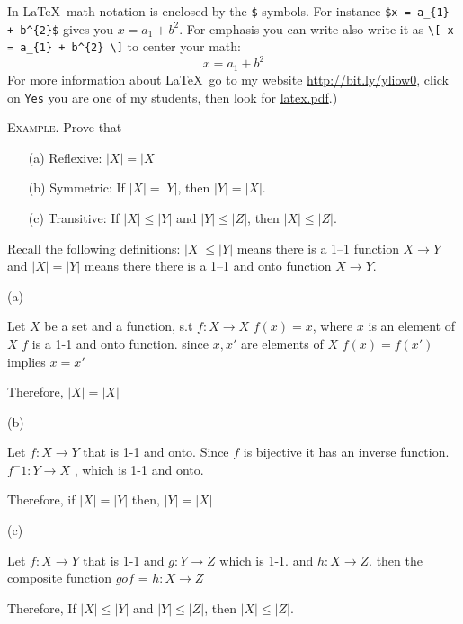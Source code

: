 

\renewcommand\AUTHOR{nweadick1@cougars.ccis.edu} %


\topmattertwo

In \LaTeX\, math notation is enclosed by the \verb!$! symbols.
For instance \verb!$x = a_{1} + b^{2}$! gives you $x = a_{1} + b^{2}$.
For emphasis you can write also write it as
\verb!\[ x = a_{1} + b^{2} \]!
to center your math:
\[
x = a_{1} + b^{2}
\]
For more information about \LaTeX\, go to my
website
\href{http://bit.ly/yliow0}{http://bit.ly/yliow0},
click on \verb!Yes!
you are one of my students,
then look for
\href{https://drive.google.com/file/d/0BzjYrK0VFuMWZm5xV0kyR3J2Zm8/view?usp=sharing}{latex.pdf}.)

\newpage
\textsc{Example.}
Prove that
\begin{enumerate}[nosep]
\item[(a)] Reflexive: $|X| = |X|$
\item[(b)] Symmetric: If $|X| = |Y|$, then $|Y| = |X|$.
\item[(c)] Transitive: If $|X| \leq |Y|$ and $|Y| \leq |Z|$, then
$|X| \leq |Z|$.
\end{enumerate}

Recall the following definitions:
$|X| \leq |Y|$ means there is a 1--1 function $X \rightarrow Y$
and $|X| = |Y|$ means there there is a 1--1 and onto function $X \rightarrow Y$.

\SOLUTION

(a)

Let $X$ be a set and a function, s.t $f:X \rightarrow X$
$f(x)=x$, where $x$ is an element of $X$
$f$ is a 1-1 and onto function. 
since $x,x'$ are elements of $X$
$f(x) = f(x')$ implies $x=x'$

Therefore, $|X| = |X|$

(b) 

Let $f:X \rightarrow Y$ that is 1-1 and onto. Since $f$ is bijective it has an inverse function.
$f^-1: Y \rightarrow X$ , which is 1-1 and onto. 

Therefore, if $|X| = |Y|$ then, $|Y| = |X|$

(c)

Let $f:X \rightarrow Y$ that is 1-1 and $g:Y \rightarrow Z$ which is 1-1. and $h:X \rightarrow Z$.
then the composite function $gof$ = $h:X \rightarrow Z$

Therefore, If $|X| \leq |Y|$ and $|Y| \leq |Z|$, then $|X| \leq |Z|$.





